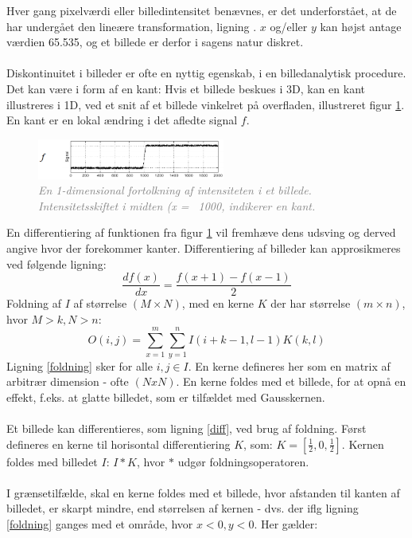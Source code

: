 Hver gang pixelværdi eller billedintensitet benævnes, er det underforstået, at de har undergået den lineære transformation, ligning \cite{lumosity}. $x$ og/eller $y$ kan højst antage værdien 65.535, og et billede er derfor i sagens natur diskret.
\\
\\
Diskontinuitet i billeder er ofte en nyttig egenskab, i en billedanalytisk procedure. Det kan være i form af en kant: Hvis et billede beskues i 3D, kan en kant illustreres i 1D, ved et snit af et billede vinkelret på overfladen, illustreret figur \ref{fig:kant}. En kant er en lokal ændring i det afledte signal $f$.
\noindent
\begin{figure}[H]
    \centering
    \includegraphics[width=0.55\textwidth]{fig/7.png}
     \vspace{-1em}
    \begin{center}        
     \caption{\textcolor{gray}{\footnotesize \textit{
En 1-dimensional fortolkning af intensiteten i et billede. Intensitetsskiftet i midten (x = ~1000, indikerer en kant.}}}
    \label{fig:kant}
     \end{center}
       \vspace{-2.5em}
  \end{figure}
\noindent
En differentiering af funktionen fra figur \ref{fig:kant} vil fremhæve dens udsving og derved angive hvor der forekommer kanter. Differentiering af billeder kan approsikmeres ved følgende ligning:
\begin{equation}
\dfrac{df(x)}{dx}=\dfrac{f(x+1)-f(x-1)}{2}
\label{diff}
\end{equation}
Foldning af $I$ af størrelse $(M \times N)$, med en kerne $K$ der har størrelse $(m \times n)$, hvor $M > k, N > n$:
\begin{equation}
O(i,j) = \sum\limits_{x=1}^m \sum\limits_{y=1}^n I(i+k-1,l-1)K(k,l)
\label{foldning}
\end{equation}
Ligning \eqref{foldning} sker for alle $i,j \in I$. En kerne defineres her som en matrix af arbitrær dimension - ofte $(NxN)$. En kerne foldes med et billede, for at opnå en effekt, f.eks. at glatte billedet, som er tilfældet med Gausskernen. 
\\
\\
Et billede kan differentieres, som ligning \eqref{diff}, ved brug af foldning. Først defineres en kerne til horisontal differentiering $K$, som: $K = [\frac{1}{2}, 0, \frac{1}{2}]$. Kernen foldes med billedet $I$: $I \ast K $, hvor $\ast$ udgør foldningsoperatoren.
\\
\\
I grænsetilfælde, skal en kerne foldes med et billede, hvor afstanden til kanten af billedet, er skarpt mindre, end størrelsen af kernen - dvs. der iflg ligning \eqref{foldning} ganges med et område, hvor $x < 0, y < 0$. Her gælder:


